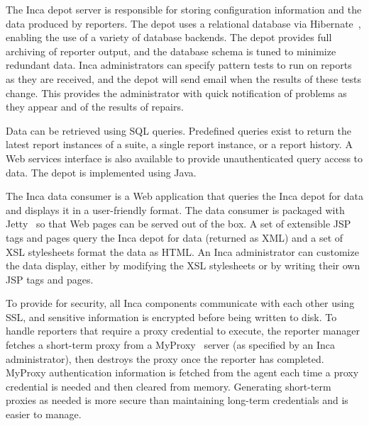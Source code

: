 \documentclass[times,10pt,twocolumn]{article}
\begin{document}

The Inca depot server is responsible for storing configuration information and
the data produced by reporters. The depot uses a relational database via
Hibernate~\cite{hibernate}, enabling the use of a variety of database backends.
The depot provides full archiving of reporter output, and the database schema is
tuned to minimize redundant data.  Inca administrators can specify pattern
tests to run on reports as they are received, and the depot will send email
when the results of these tests change.  This provides the administrator
with quick notification of problems as they appear and of the results of
repairs.

Data can be retrieved using SQL queries. Predefined queries exist to return the
latest report instances of a suite, a single report instance, or a report
history.  A Web services interface is also available to provide
unauthenticated query access to data.  The depot is implemented using Java.


The Inca data consumer is a Web application that queries the Inca depot for
data and displays it in a user-friendly format.  The data consumer is packaged
with Jetty~\cite{jetty} so that Web pages can be served out of the box.  A set
of extensible JSP tags and pages query the Inca depot for data (returned as
XML)
and a set of XSL stylesheets format the data as HTML.  An Inca administrator
can customize the data display, either by modifying the XSL stylesheets or by
writing their own JSP tags and pages.

\label{security}

To provide for security, all Inca components communicate with each other using
SSL, and sensitive information is encrypted before being written to disk.  To
handle reporters that
require a proxy credential to execute, the reporter manager fetches a
short-term proxy from a MyProxy~\cite{myproxy} server (as specified by an Inca
administrator), then destroys the proxy once the reporter has completed.
MyProxy authentication information is fetched from the agent each time a proxy
credential is needed and then cleared from memory.  Generating short-term 
proxies as needed is more secure than maintaining long-term
credentials and is easier to manage.

\end{document}
